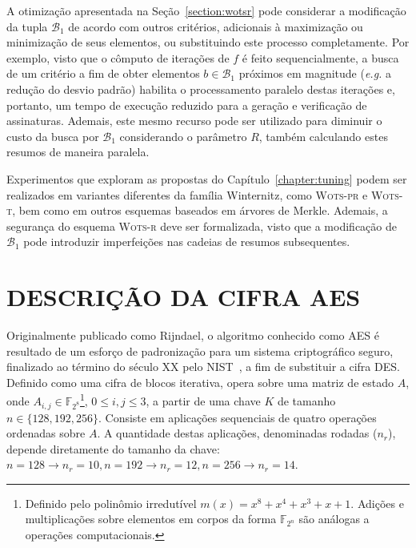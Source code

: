 \documentclass{ufsctex/ufsctex}
\newcommand{\bone}{\mathcal{B}_{1}}
\newcommand{\wotsprf}{\textsc{Wots-pr}}
\newcommand{\wotst}{\textsc{Wots-t}}
\newcommand{\wotsr}{\textsc{Wots-r}}
\begin{document}
A otimização apresentada na Seção~\ref{section:wotsr} pode considerar a
modificação da tupla $\bone{}$ de acordo com outros critérios, adicionais à
maximização ou minimização de seus elementos, ou substituindo este processo
completamente. Por exemplo, visto que o cômputo de iterações de $f$ é feito
sequencialmente, a busca de um critério a fim de obter elementos $b \in
\bone{}$ próximos em magnitude (\emph{e.g.} a redução do desvio padrão)
habilita o processamento paralelo destas iterações e, portanto, um tempo de
execução reduzido para a geração e verificação de assinaturas. Ademais, este
mesmo recurso pode ser utilizado para diminuir o custo da busca por $\bone{}$
considerando o parâmetro $R$, também calculando estes resumos de maneira
paralela.

Experimentos que exploram as propostas do Capítulo~\ref{chapter:tuning} podem
ser realizados em variantes diferentes da família Winternitz, como \wotsprf{} e
\wotst{}, bem como em outros esquemas baseados em árvores de Merkle. Ademais, a
segurança do esquema \wotsr{} deve ser formalizada, visto que a modificação de
$\bone{}$ pode introduzir imperfeições nas cadeias de resumos subsequentes.




\apendice

\chapter{DESCRIÇÃO DA CIFRA AES}\label{chapter:aes}

Originalmente publicado como Rijndael, o algoritmo conhecido como
AES é resultado de um esforço
de padronização para um sistema criptográfico seguro, finalizado ao término do
século XX pelo NIST~\cite{Dworkin:report:2001:nov}, a fim de substituir a cifra
DES. Definido como uma cifra de
blocos iterativa, opera sobre uma matriz de estado $A$, onde $A_{i, j} \in
\mathbb{F}_{2^{8}}$\footnote{Definido pelo polinômio irredutível $m(x) = x^{8} + x^{4} + x^{3}
+ x + 1$. Adições e multiplicações sobre elementos em corpos da forma
$\mathbb{F}_{2^{n}}$ são análogas a operações computacionais.}, $0 \leq i, j
\leq 3$, a partir de uma chave $K$ de tamanho $n \in \{128, 192, 256\}$.
Consiste em aplicações sequenciais de quatro operações ordenadas sobre $A$. A
quantidade destas aplicações, denominadas rodadas ($n_{r}$), depende
diretamente do tamanho da chave: $n = 128 \rightarrow n_{r} = 10, n = 192
\rightarrow n_{r} = 12, n = 256 \rightarrow n_{r} = 14$.
\end{document}
